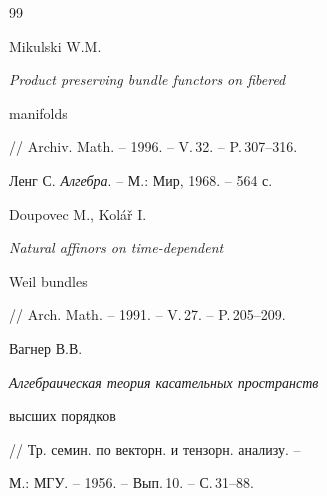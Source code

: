\begin{thebibliography}{99}


Mikulski W.M. {\it Product preserving bundle functors on fibered


manifolds} // Archiv. Math. -- 1996. -- V.\,32. -- P.\,307--316.







Ленг С. {\it Алгебра}. -- М.: Мир, 1968. -- 564 с.







Doupovec M., Kol\'{a}\v{r} I. {\it Natural affinors on time-dependent


Weil bundles} // Arch. Math. -- 1991. -- V.\,27. -- P.\,205--209.







Вагнер В.В. {\it Алгебраическая теория касательных пространств


высших порядков} // Тр. семин. по векторн. и тензорн. анализу. --


М.: МГУ. -- 1956. -- Вып.\,10. -- С.\,31--88.





\end{thebibliography}





\vskip 1cm












\label{end}





